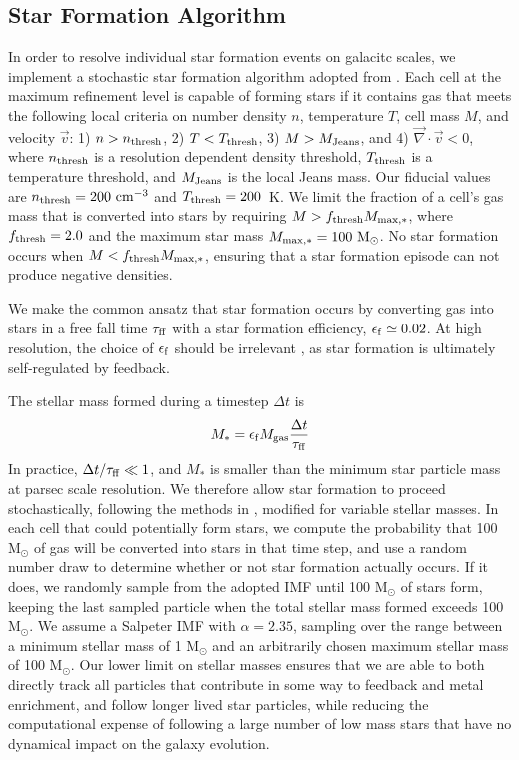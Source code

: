 \documentclass[twocolumn]{aastex61}
\begin{document}
\subsection{Star Formation Algorithm}
\label{sec:star formation}
In order to resolve individual star formation events on galacitc scales, we implement a stochastic star formation algorithm adopted from \citet{Goldbaum2015,Goldbaum2016}. Each cell at the maximum refinement level is capable of forming stars if it contains gas that meets the following local criteria on number density $n$, temperature $T$, cell mass $M$, and velocity $\vec{v}$: 1) $n > n_{\rm thresh}$, 2) $T < T_{\rm thresh}$, 3) $M > M_{\rm Jeans}$, and 4) $\vec{\nabla} \cdot \vec{v} < 0$, where $n_{\rm thresh}$ is a resolution dependent density threshold, $T_{\rm thresh}$ is a temperature threshold, and $M_{\rm Jeans}$ is the local Jeans mass. Our fiducial values are $n_{\rm thresh} =  200 \mbox{ cm}^{-3}$ and $T_{\rm thresh}= 200$~K. We limit the fraction of a cell's gas mass that is converted into stars by requiring $M > f_{\rm thresh} M_{\rm max,*}$, where $f_{\rm thresh} = 2.0 $ and the maximum star mass $M_{\rm max,*} = 100 \mbox{ M}_{\odot}$. No star formation occurs when $M < f_{\rm thresh} M_{\rm max,*}$, ensuring that a star formation episode can not produce negative densities.

We make the common ansatz that star formation occurs by converting gas into stars in a free fall time $\tau_{\rm ff}$ with a star formation efficiency, $\epsilon_{\rm f} \simeq 0.02$. At high resolution, the choice of $\epsilon_{\rm f}$ should be irrelevant \citep{Orr2017, FIRE2}, as star formation is ultimately self-regulated by feedback.

The stellar mass formed during a timestep $\Delta t$ is
\begin{equation}
         M_* = \epsilon_{\rm f} M_{\rm gas} \frac{\Delta t}{\tau_{\rm ff}}
\end{equation}
In practice, $\Delta t/\tau_{\rm ff} \ll 1$, and $M_*$ is smaller than the minimum star particle mass at parsec scale resolution. We therefore allow star formation to proceed stochastically, following the methods in \citet{Goldbaum2015, Goldbaum2016}, modified for variable stellar masses. In each cell that could potentially form stars, we compute the probability that 100 M$_{\odot}$ of gas will be converted into stars in that time step, and use a random number draw to determine whether or not star formation actually occurs. If it does, we randomly sample from
the adopted IMF until 100 M$_{\odot}$ of stars form, keeping the last sampled particle when the total stellar mass formed exceeds 100 M$_{\odot}$. We assume a Salpeter IMF \citep{Salpeter1955} with $\alpha = 2.35$, sampling over the range between a minimum stellar mass of 1 M$_{\odot}$ and an arbitrarily chosen maximum stellar mass of 100 M$_{\odot}$. Our lower limit on stellar masses ensures that we are able to both directly track all particles that contribute in some way to feedback and metal enrichment, and follow longer lived star particles, while reducing the computational expense of following a large number of low mass stars that have no dynamical impact on the galaxy evolution.
\end{document}
